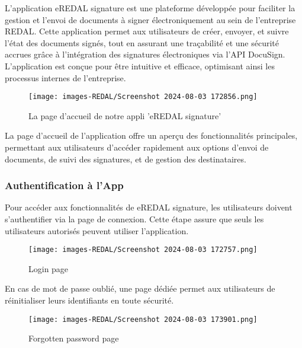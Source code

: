 L'application eREDAL signature est une plateforme développée pour faciliter la gestion et l'envoi de documents à signer électroniquement au sein de l'entreprise REDAL. Cette application permet aux utilisateurs de créer, envoyer, et suivre l'état des documents signés, tout en assurant une traçabilité et une sécurité accrues grâce à l'intégration des signatures électroniques via l'API DocuSign. L'application est conçue pour être intuitive et efficace, optimisant ainsi les processus internes de l'entreprise.

\begin{figure}[H]
\begin{center}
\texttt{[image: images-REDAL/Screenshot 2024-08-03 172856.png]}
\end{center}
\caption{La page d'accueil de notre appli 'eREDAL signature'}
\end{figure}

La page d'accueil de l'application offre un aperçu des fonctionnalités principales, permettant aux utilisateurs d'accéder rapidement aux options d'envoi de documents, de suivi des signatures, et de gestion des destinataires.

\subsubsection{Authentification à l'App}

Pour accéder aux fonctionnalités de eREDAL signature, les utilisateurs doivent s'authentifier via la page de connexion. Cette étape assure que seuls les utilisateurs autorisés peuvent utiliser l'application.

\begin{figure}[H]
\begin{center}
\texttt{[image: images-REDAL/Screenshot 2024-08-03 172757.png]}
\end{center}
\caption{Login page }
\end{figure}

En cas de mot de passe oublié, une page dédiée permet aux utilisateurs de réinitialiser leurs identifiants en toute sécurité.

\begin{figure}[H]
\begin{center}
\texttt{[image: images-REDAL/Screenshot 2024-08-03 173901.png]}
\end{center}
\caption{Forgotten password page}
\end{figure}

